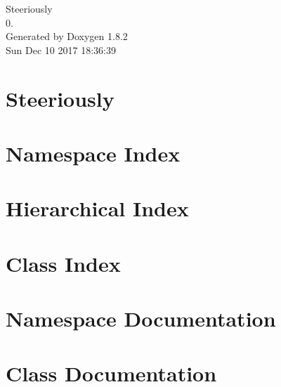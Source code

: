 \documentclass{book}
\begin{document}
\hypersetup{pageanchor=false,citecolor=blue}
\begin{titlepage}
\vspace*{7cm}
\begin{center}
{\Large Steeriously \\[1ex]\large 0. }\\
\vspace*{1cm}
{\large Generated by Doxygen 1.8.2}\\
\vspace*{0.5cm}
{\small Sun Dec 10 2017 18:36:39}\\
\end{center}
\end{titlepage}
\clearemptydoublepage
{}
\tableofcontents
\clearemptydoublepage
{}
\hypersetup{pageanchor=true,citecolor=blue}
\chapter{Steeriously}
\label{index}\hypertarget{index}{}
\chapter{Namespace Index}

\chapter{Hierarchical Index}

\chapter{Class Index}

\chapter{Namespace Documentation}

\chapter{Class Documentation}




















\printindex
\end{document}
